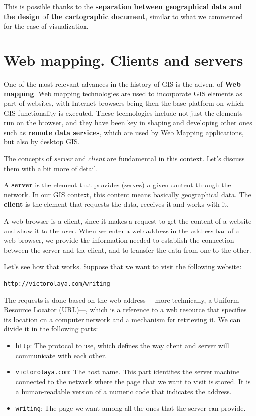 This is possible thanks to the \textbf{separation between geographical data and the design of the cartographic document}, similar to what we commented for the case of visualization.


\section{Web mapping. Clients and servers}

One of the most relevant advances in the history of GIS is the advent of \textbf{Web mapping}. Web mapping technologies are used to incorporate GIS elements as part of websites, with Internet browsers being then the base platform on which GIS functionality is executed. These technologies include not just the elements run on the browser, and they have been key in shaping and developing other ones such as \textbf{remote data services}, which are used by Web Mapping applications, but also by desktop GIS.

The concepts of \emph{server} and \emph{client} are fundamental in this context. Let's discuss them with a bit more of detail.

A \textbf{server} is the element that provides (serves) a given content through the network. In our GIS context, this content means basically geographical data. The \textbf{client} is the element that requests the data, receives it and works with it. 

A web browser is a client, since it makes a request to get the content of a website and show it to the user. When we enter a web address in the address bar of a web browser, we provide the information needed to establish the connection between the server and the client, and to transfer the data from one to the other.

Let's see how that works. Suppose that we want to visit the following website:

\begin{center}
\small\texttt{http://victorolaya.com/writing}
\end{center}

The requests is done based on the web address ---more technically, a Uniform Resource Locator (URL)---, which is a reference to a web resource that specifies its location on a computer network and a mechanism for retrieving it. We can divide it in the following parts:

\begin{itemize}
	\item \texttt{http}: The protocol to use, which defines the way client and server will communicate with each other.
	\item \texttt{victorolaya.com}: The host name. This part identifies the server machine connected to the network where the page that we want to visit is stored. It is a human-readable version of a numeric code that indicates the address.
	\item \texttt{writing}: The page we want among all the ones that the server can provide. 
\end{itemize}

